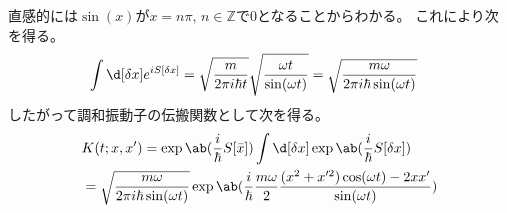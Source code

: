 直感的には$\sin(x)$が$x=n\pi,\,n\in\mathbb{Z}$で0となることからわかる。
これにより次を得る。
\begin{equation}
  \begin{split}
    &\int\d[\delta x]e^{iS[\delta x]}
    =\sqrt{\frac{m}{2\pi i\hbar t}}
    \sqrt{
      \frac{\omega t}{\sin(\omega t)}
    }
    =\sqrt{\frac{m\omega}{2\pi i\hbar\sin(\omega t)}}
  \end{split}
\end{equation}
したがって調和振動子の伝搬関数として次を得る。
\begin{equation}
  \begin{split}
    &K(t;x,x')
    =\exp\ab(\frac{i}{\hbar}S[\bar{x}])
    \int\d[\delta x]\exp\ab(\frac{i}{\hbar}S[\delta x]) \\
    &=\sqrt{\frac{m\omega}{2\pi i\hbar\sin(\omega t)}}
    \exp\ab(\frac{i}{\hbar}
    \frac{m\omega}{2}\frac{
        (x^2+x'^2)\cos(\omega t)-2xx'
      }{\sin(\omega t)})
  \end{split}
\end{equation}